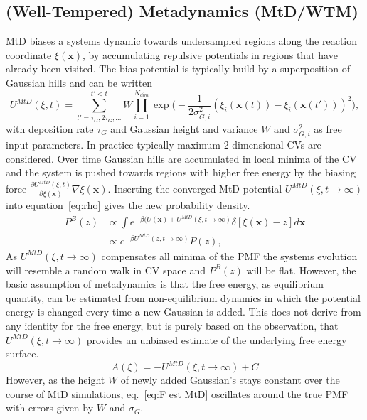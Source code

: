 \subsection{(Well-Tempered) Metadynamics (MtD/WTM)}
\label{sec:metaD}
MtD biases a systems dynamic towards undersampled regions along the reaction coordinate $\xi(\textbf{x})$, by accumulating repulsive potentials in regions that have already been visited.\autocite{barducci2011metadynamics} The bias potential is typically build by a superposition of Gaussian hills and can be written
\begin{equation}
  U^{MtD}(\xi,t)= \sum_{t'=\tau_G,2\tau_G,...}^{t'<t} W \prod_{i=1}^{N_{dim}} \exp\biggr(-\frac{1}{2\sigma_{G,i}^{2}} (\xi_{i}(\textbf{x}(t))-\xi_{i}(\textbf{x}(t')))^2 \biggl),
  \label{eq:U_mtD}
\end{equation}
with deposition rate $\tau_G$ and Gaussian height and variance $W$ and $\sigma_{G,i}^2$ as free input parameters.
In practice typically maximum 2 dimensional CVs are considered.
Over time Gaussian hills are accumulated in local minima of the CV and the system is pushed towards regions with higher free energy by the biasing force $\frac{\partial U^{MtD}(\xi,t)}{\partial\xi(\textbf{x})}\nabla\xi(\textbf{x})$.
Inserting the converged MtD potential $U^{MtD}(\xi,t\to\infty)$ into equation~\ref{eq:rho} gives the new probability density.
\begin{equation}
  \begin{split}
    P^B(z) &\propto \int e^{-\beta (U(\textbf{x})+U^{MtD}(\xi,t\to\infty)}\delta[\xi(\textbf{x})-z]d\textbf{x} \\
    &\propto e^{-\beta U^{MtD}(z,t\to\infty)} P(z),
  \end{split}
\end{equation}
As $U^{MtD}(\xi,t\to\infty)$ compensates all minima of the PMF the systems evolution will resemble a random walk in CV space and $P^B(z)$ will be flat.
However, the basic assumption of metadynamics is that the free energy, as equilibrium quantity, can be estimated from non-equilibrium dynamics in which the potential energy is changed every time a new Gaussian is added.
This does not derive from any identity for the free energy, but is purely based on the observation, that $U^{MtD}(\xi,t\to\infty)$ provides an unbiased estimate of the underlying free energy surface.\autocite{bussi2006equilibrium}
\begin{equation}
  A(\xi) = -U^{MtD}(\xi, t \to \infty) + C \label{eq:F est MtD}
\end{equation}
However, as the height $W$ of newly added Gaussian's stays constant over the course of MtD simulations, eq.~\ref{eq:F est MtD} oscillates around the true PMF with errors given by $W$ and $\sigma_G$.
